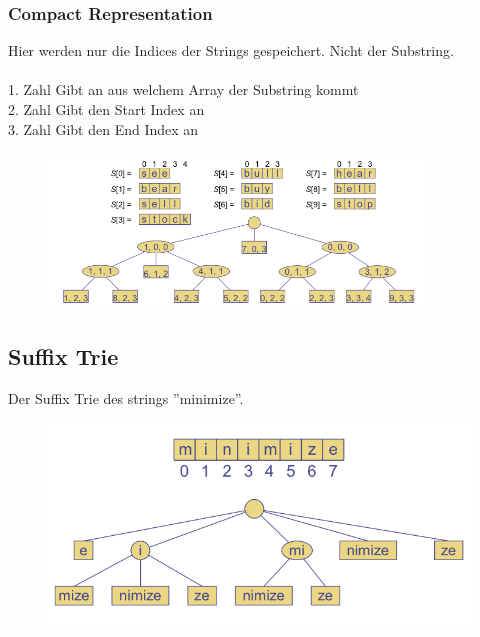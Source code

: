 \documentclass[a4paper,10pt]{report}
\begin{document}
\subsubsection{Compact Representation}
Hier werden nur die Indices der Strings gespeichert. Nicht der Substring.\\
\\
1. Zahl Gibt an aus welchem Array der Substring kommt\\
2. Zahl Gibt den Start Index an\\
3. Zahl Gibt den End Index an 
\begin{figure}[H]
	\begin{center}
  		\includegraphics[width=0.9\textwidth]{img/compresstriecompactRepresentation.png}
	\end{center}
\end{figure}
\newpage
\subsection{Suffix Trie}
Der Suffix Trie des strings ''minimize''.
\begin{figure}[H]
	\begin{center}
  		\includegraphics[width=\textwidth]{img/suffixTrie1.png}
	\end{center}
\end{figure}
\end{document}
